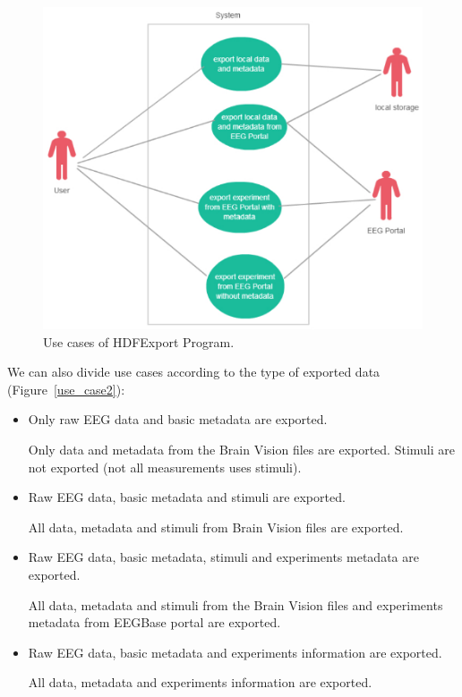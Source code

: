 \documentclass[conference]{IEEEtran}
\begin{document}
\begin{figure}
	\includegraphics[scale=0.5]{obrazky/use_case_location.pdf}	
	\caption{Use cases of HDFExport Program.}
	\label{use_case1}
\end{figure}
We can also divide use cases according to the type of exported data (Figure~\ref{use_case2}):
\begin{itemize}
	\item Only raw EEG data and basic metadata are exported.
	
	Only data and metadata from the Brain Vision files are exported. Stimuli are not exported (not all measurements uses stimuli).
	\item Raw EEG data, basic metadata and stimuli are exported.
	
	All data, metadata and stimuli from Brain Vision files are exported.
	\item Raw EEG data, basic metadata, stimuli and experiments metadata are exported.
	
	All data, metadata and stimuli from the Brain Vision files and experiments metadata from EEGBase portal are exported.
	\item Raw EEG data, basic metadata and experiments information are exported.
	
	All data, metadata and experiments information are exported.
\end{itemize}
\end{document}
